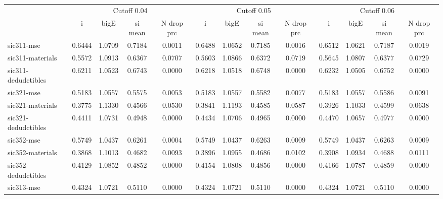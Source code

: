 \begin{tabular}{lcccccccccccc} \toprule
 & \multicolumn{4}{c}{Cutoff 0.04} & \multicolumn{4}{c}{Cutoff 0.05} & \multicolumn{4}{c}{Cutoff 0.06} \\ \cmidrule(r){2-5} \cmidrule(lr){6-9} \cmidrule(l){10-13}
 & i  & bigE  & si mean  & N drop prc  & i  & bigE  & si mean  & N drop prc  & i  & bigE  & si mean  & N drop prc  \\  \hline 
sic311-mse &    0.6444 &    1.0709 &    0.7184 &    0.0011 &    0.6488 &    1.0652 &    0.7185 &    0.0016 &    0.6512 &    1.0621 &    0.7187 &    0.0019 \\  
sic311-materials &    0.5572 &    1.0913 &    0.6367 &    0.0707 &    0.5603 &    1.0866 &    0.6372 &    0.0719 &    0.5645 &    1.0807 &    0.6377 &    0.0729 \\  
sic311-dedudctibles &    0.6211 &    1.0523 &    0.6743 &    0.0000 &    0.6218 &    1.0518 &    0.6748 &    0.0000 &    0.6232 &    1.0505 &    0.6752 &    0.0000 \\ \hline 
sic321-mse &    0.5183 &    1.0557 &    0.5575 &    0.0053 &    0.5183 &    1.0557 &    0.5582 &    0.0077 &    0.5183 &    1.0557 &    0.5586 &    0.0091 \\  
sic321-materials &    0.3775 &    1.1330 &    0.4566 &    0.0530 &    0.3841 &    1.1193 &    0.4585 &    0.0587 &    0.3926 &    1.1033 &    0.4599 &    0.0638 \\  
sic321-dedudctibles &    0.4411 &    1.0731 &    0.4948 &    0.0000 &    0.4434 &    1.0706 &    0.4965 &    0.0000 &    0.4470 &    1.0657 &    0.4977 &    0.0000 \\  \hline
sic352-mse &    0.5749 &    1.0437 &    0.6261 &    0.0004 &    0.5749 &    1.0437 &    0.6263 &    0.0009 &    0.5749 &    1.0437 &    0.6263 &    0.0009 \\  
sic352-materials &    0.3868 &    1.1013 &    0.4682 &    0.0093 &    0.3896 &    1.0955 &    0.4686 &    0.0102 &    0.3908 &    1.0934 &    0.4688 &    0.0111 \\  
sic352-dedudctibles &    0.4129 &    1.0852 &    0.4852 &    0.0000 &    0.4154 &    1.0808 &    0.4856 &    0.0000 &    0.4166 &    1.0787 &    0.4859 &    0.0000 \\  \hline
sic313-mse &    0.4324 &    1.0721 &    0.5110 &    0.0000 &    0.4324 &    1.0721 &    0.5110 &    0.0000 &    0.4324 &    1.0721 &    0.5110 &    0.0000 \\  

\end{tabular}
